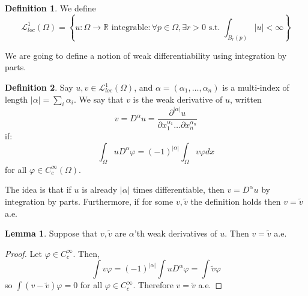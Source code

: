 \documentclass[12pt, a4paper]{article}
\theoremstyle{definition}
\newtheorem{lemma}{Lemma}
\newtheorem{defn}{Definition}
\newcommand{\R}{\mathbb{R}}                           %
\newcommand{\eL}{\mathcal{L}}                         %
\newcommand{\st}{\text{ s.t. }}
\begin{document}
\begin{tcolorbox}[colback = white]
\begin{defn}
	We define $$\eL^1_{loc}(\Omega) = \left\{ u: \Omega \to \R \text{ integrable}: \forall p \in \Omega , \exists r>0 \st \int_{B_r(p)} |u| <\infty \right\}$$
\end{defn}
\end{tcolorbox}
We are going to define a notion of weak differentiability using integration by parts. 
\begin{tcolorbox}[colback = white]
\begin{defn}
	Say $u,v \in \eL^1_{loc}(\Omega)$, and $\alpha = \left( \alpha_1, \dots , \alpha_n \right)$ is a multi-index of length $|\alpha| =  \sum_i \alpha_i$. We say that $v$ is the weak derivative of $u$, written 
	$$ v = D^\alpha u = \frac{ \partial^{|\alpha|} u }{ \partial x_1^{\alpha_1} \dots \partial x_n^{\alpha_n} } $$ if: 
	$$ \int_\Omega u D^\alpha \varphi = (-1)^{|\alpha|} \int_\Omega v \varphi dx$$
	for all $\varphi \in C_c^\infty(\Omega)$. 
\end{defn}
\end{tcolorbox}
The idea is that if $u$ is already $|\alpha|$ times differentiable, then $v = D^\alpha u$ by integration by parts. 
Furthermore, if for some $v, \tilde{v}$ the definition holds then $v = \tilde{v}$ a.e.
\begin{tcolorbox}
\begin{lemma}
	Suppose that $v , \tilde{v}$ are $\alpha$'th weak derivatives of $u$. Then $v = \tilde{v} $ a.e.
\end{lemma}

\end{tcolorbox}
\begin{proof}
Let $\varphi \in C_c^\infty$. Then, 
	$$ \int v \varphi = (-1)^{|\alpha|} \int u D^\alpha \varphi = \int \tilde{v} \varphi $$ 
	so $\int (v - \tilde{v} ) \varphi = 0 $ for all $\varphi \in C_c^\infty$. Therefore $v = \tilde{v} $ a.e. 
\end{proof}
\end{document}
